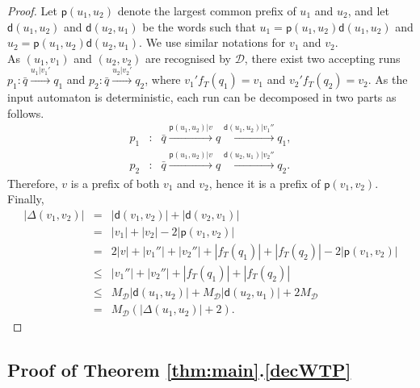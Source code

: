 \documentclass[envcountsame]{llncs}
\begin{document}
\begin{proof}
Let $\textsf{p}(u_1,u_2)$ denote the largest common prefix of $u_1$ and $u_2$, and let $\textsf{d}(u_1,u_2)$ and $\textsf{d}(u_2,u_1)$ be the words such that $u_1 = \textsf{p}(u_1,u_2) \textsf{d}(u_1,u_2)$ and $u_2 = \textsf{p}(u_1,u_2) \textsf{d}(u_2,u_1)$.
We use similar notations for $v_1$ and $v_2$.\\
As $(u_1,v_1)$ and $(u_2,v_2)$ are recognised by $\mathcal{D}$, there exist two accepting runs $p_1 : \bar{q} \xrightarrow{u_1|v_1'} q_1$ and $p_2 : \bar{q} \xrightarrow{u_2|v_2'} q_2$, where $v_1'f_T(q_1) = v_1$ and $v_2'f_T(q_2) = v_2$.
As the input automaton is deterministic, each run can be decomposed in two parts as follows. 
$$\begin{array}{lcl}
p_1 & : &  \bar{q} \xrightarrow{\textsf{p}(u_1,u_2)|v} q \xrightarrow{\textsf{d}(u_1,u_2)|v_1''} q_1,\\
p_2 & : & \bar{q} \xrightarrow{\textsf{p}(u_1,u_2)|v} q \xrightarrow{\textsf{d}(u_2,u_1)|v_2''} q_2.
\end{array}$$
Therefore, $v$ is a prefix of both $v_1$ and $v_2$, hence it is a prefix of $\textsf{p}(v_1,v_2)$.
Finally,
$$\begin{array}{lcl}
|\Delta(v_1,v_2)| & = & |\textsf{d}(v_1,v_2)| + |\textsf{d}(v_2,v_1)|\\
& = & |v_1| + |v_2| - 2|\textsf{p}(v_1,v_2)|\\
& = & 2 |v| + |v_1''| + |v_2''| + |f_T(q_1)| + |f_T(q_2)| - 2|\textsf{p}(v_1,v_2)|\\
& \leq & |v_1''| + |v_2''| + |f_T(q_1)| + |f_T(q_2)|\\
& \leq & M_{\mathcal{D}} |\textsf{d}(u_1,u_2)| + M_{\mathcal{D}} |\textsf{d}(u_2,u_1)| + 2 M_{\mathcal{D}}\\
& = & M_{\mathcal{D}} (|\Delta(u_1,u_2)|+2).
\end{array}$$
\end{proof}


\subsection*{Proof of Theorem \ref{thm:main}.\ref{decWTP}}
\end{document}
